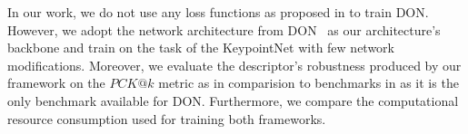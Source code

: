 In our work, we do not use any loss functions as proposed in \parencites{florence2018dense}{florence2020dense}{kupcsik2021supervised}{adrian2022efficient}{hadjivelichkov2021fully}{nerf-Supervision}
to train DON. However, we adopt the network architecture from DON~\cite{florence2018dense}
as our architecture's backbone and train on the task of the KeypointNet\parencites{suwajanakorn2018discovery}{zhao2020learning}
with few network modifications. Moreover, we evaluate the descriptor's robustness produced by our framework on the $PCK@k$ metric as in comparision
to benchmarks in \cite{adrian2022efficient} as it is the only benchmark available for DON.
Furthermore, we compare the computational resource consumption used for training both frameworks.